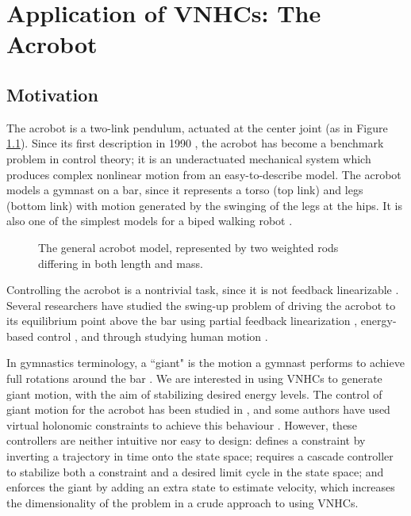 

\chapter{Application of VNHCs: The Acrobot}\label{ch:acrobot}
\section{Motivation}
The acrobot is a two-link pendulum, actuated at the center joint (as in Figure
\ref{fig:acrobot-model}). 
Since its first description in 1990
\cite{nonlinear_controllers_nonintegrable_acrobot}, the acrobot has become a
benchmark problem in control theory; 
it is an underactuated mechanical system which produces complex nonlinear motion
from an easy-to-describe model.
The acrobot models a gymnast on a bar, since it represents a torso (top link)
and legs (bottom link) with motion generated by the swinging of the legs at the
hips. 
It is also one of the simplest models for a biped walking robot
\cite{toward_framework_biped_locomotion}.

\begin{figure}
    \centering
    
    \caption{The general acrobot model, represented by two weighted rods
    differing in both length and mass.}%
    \label{fig:acrobot-model}
\end{figure}

Controlling the acrobot is a nontrivial task, since it is not feedback
linearizable \cite{nonlinear_controllers_nonintegrable_acrobot}. 
Several researchers have studied the swing-up problem of driving the acrobot to
its equilibrium point above the bar using partial feedback linearization
\cite{swingup_problem_acrobot}, energy-based control
\cite{swingup_acrobot_pendulum, swingup_acrobot_energy}, and through studying
human motion \cite{swingup_giant_acrobot, motion_control_gymnastic_skill}.

In gymnastics terminology, a ``giant" is the motion a gymnast performs to
achieve full rotations around the bar \cite{usagym_giant}. 
We are interested in using VNHCs to generate giant motion, with the aim of
stabilizing desired energy levels.
The control of giant motion for the acrobot has been studied in
\cite{energy_pumping_robotic_swinging, swingup_giant_acrobot}, 
and some authors have used virtual holonomic constraints to achieve this
behaviour
\cite{dynamical_servo_acrobot_vc, control_giant_two_link_gymnastic_robot,
xingbo_thesis}. 
However, these controllers are neither intuitive nor easy to
design:
\cite{control_giant_two_link_gymnastic_robot} defines a constraint by inverting
a trajectory in time onto the state space; 
\cite{dynamical_servo_acrobot_vc} requires a cascade controller to stabilize
both a constraint and a desired limit cycle in the state space; 
and \cite{xingbo_thesis} enforces the giant by adding an extra state to estimate
velocity, which increases the dimensionality of the problem in a crude
approach to using VNHCs.

